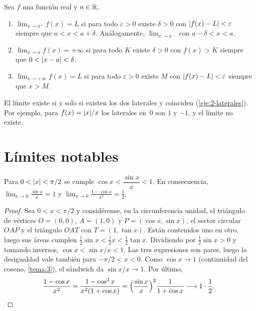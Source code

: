 \begin{definicion}\label{def:limites-variantes}
Sea $f$ una función real y $a\in\mathbb{R}$.
\begin{enumerate}
  \item $\lim_{x\to a^{+}}f(x)=L$ si para todo $\varepsilon>0$ existe $\delta>0$ con $\lvert f(x)-L\rvert<\varepsilon$ siempre que $a<x<a+\delta$. Análogamente, $\lim_{x\to a^{-}}$ con $a-\delta<x<a$.
  \item $\lim_{x\to a}f(x)=+\infty$ si para todo $K$ existe $\delta>0$ con $f(x)>K$ siempre que $0<\lvert x-a\rvert<\delta$.
  \item $\lim_{x\to+\infty}f(x)=L$ si para todo $\varepsilon>0$ existe $M$ con $\lvert f(x)-L\rvert<\varepsilon$ siempre que $x>M$.
\end{enumerate}
\end{definicion}

El límite existe si y solo si existen los dos laterales y coinciden (\cref{eje:2-laterales}). Por ejemplo, para $f(x)=\lvert x\rvert/x$ los laterales en~0 son $1$ y $-1$, y el límite no existe.

\section{Límites notables}

\begin{proposicion}[$\sin x/x$]\label{prop:senx}
Para $0<\lvert x\rvert<\pi/2$ se cumple $\cos x<\dfrac{\sin x}{x}<1$. En consecuencia, $\displaystyle\lim_{x\to0}\frac{\sin x}{x}=1$ y $\displaystyle\lim_{x\to0}\frac{1-\cos x}{x^{2}}=\frac12$.
\end{proposicion}

\begin{proof}
Sea $0<x<\pi/2$ y considérense, en la circunferencia unidad, el triángulo de vértices $O=(0,0)$, $A=(1,0)$ y $P=(\cos x,\sin x)$, el sector circular $OAP$ y el triángulo $OAT$ con $T=(1,\tan x)$. Están contenidos uno en otro, luego sus áreas cumplen $\tfrac12\sin x<\tfrac12x<\tfrac12\tan x$. Dividiendo por $\tfrac12\sin x>0$ y tomando inversos, $\cos x<\sin x/x<1$. Las tres expresiones son pares, luego la desigualdad vale también para $-\pi/2<x<0$. Como $\cos x\to1$ (continuidad del coseno, \cref{tema:3}), el sándwich da $\sin x/x\to1$. Por último,
\[
\frac{1-\cos x}{x^{2}}=\frac{1-\cos^{2}x}{x^{2}(1+\cos x)}=\Bigl(\frac{\sin x}{x}\Bigr)^{2}\frac{1}{1+\cos x}\longrightarrow 1\cdot\frac12.\qedhere
\]
\end{proof}

